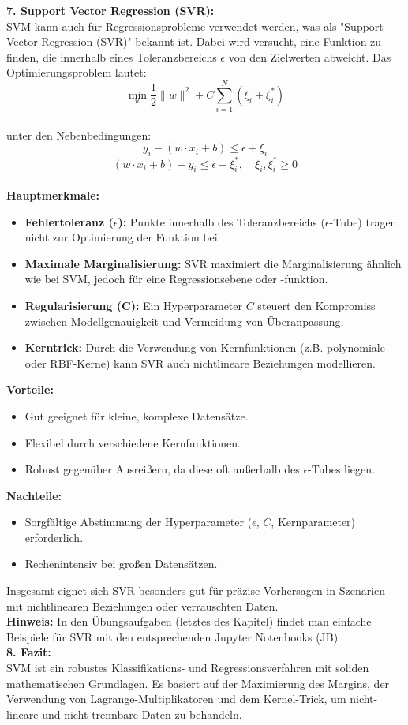 \documentclass[12pt]{article}
\begin{document}
%
\textbf{7. Support Vector Regression (SVR):}\\
SVM kann auch für Regressionsprobleme verwendet werden, was als "Support Vector Regression (SVR)" bekannt ist. Dabei wird versucht, eine Funktion zu finden, die innerhalb eines Toleranzbereichs \(\epsilon\) von den Zielwerten abweicht. Das Optimierungsproblem lautet:\\
\[
\min_w \frac{1}{2} \|w\|^2 + C \sum_{i=1}^N (\xi_i + \xi_i^*)
\]\\
unter den Nebenbedingungen:
\[
y_i - (w \cdot x_i + b) \leq \epsilon + \xi_i
\]
\[
(w \cdot x_i + b) - y_i \leq \epsilon + \xi_i^*, \quad \xi_i, \xi_i^* \geq 0
\]\\
%
\textbf{Hauptmerkmale:}
\begin{itemize}
    \item \textbf{Fehlertoleranz (\(\epsilon\)):} Punkte innerhalb des Toleranzbereichs (\(\epsilon\)-Tube) tragen nicht zur Optimierung der Funktion bei.
    \item \textbf{Maximale Marginalisierung:} SVR maximiert die Marginalisierung ähnlich wie bei SVM, jedoch für eine Regressionsebene oder -funktion.
    \item \textbf{Regularisierung (C):} Ein Hyperparameter \(C\) steuert den Kompromiss zwischen Modellgenauigkeit und Vermeidung von Überanpassung.
    \item \textbf{Kerntrick:} Durch die Verwendung von Kernfunktionen (z.B. polynomiale oder RBF-Kerne) kann SVR auch nichtlineare Beziehungen modellieren.  
\end{itemize}
%
\textbf{Vorteile:}
\begin{itemize}
    \item Gut geeignet für kleine, komplexe Datensätze.
    \item Flexibel durch verschiedene Kernfunktionen.
    \item Robust gegenüber Ausreißern, da diese oft außerhalb des \(\epsilon\)-Tubes liegen.
\end{itemize}
%
\textbf{Nachteile:}
\begin{itemize}
    \item Sorgfältige Abstimmung der Hyperparameter (\(\epsilon\), \(C\), Kernparameter) erforderlich.
    \item Rechenintensiv bei großen Datensätzen.
\end{itemize}
%
Insgesamt eignet sich SVR besonders gut für präzise Vorhersagen in Szenarien mit nichtlinearen Beziehungen oder verrauschten Daten.\\[0.2cm]
\textbf{Hinweis:} In den Übungsaufgaben (letztes des Kapitel) findet man einfache Beispiele für SVR mit den entsprechenden Jupyter Notenbooks (JB)\\[0.2cm]
%
\textbf{8. Fazit:}\\
SVM ist ein robustes Klassifikations- und Regressionsverfahren mit soliden mathematischen Grundlagen. Es basiert auf der Maximierung des Margins, der Verwendung von Lagrange-Multiplikatoren und dem Kernel-Trick, um nicht-lineare und nicht-trennbare Daten zu behandeln.\\[0.2cm]
%
\end{document}
